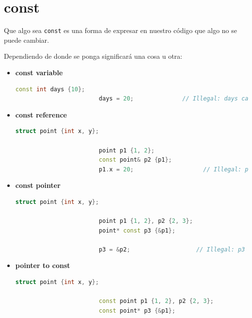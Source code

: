 \documentclass[12pt, fleqn]{report}                             %
\theoremstyle{break}                                            %
\newcommand{\textCode}[1]  { \texttt{#1} }                      %
\begin{document}
        \section{const}


            Que algo sea \textCode{const} es una forma de expresar en nuestro código que
            algo no se puede cambiar.
            
            Dependiendo de donde se ponga significará una cosa u otra:
            \begin{itemize}
                \item \textbf{const variable}
                    \begin{lstlisting}[language=C++, gobble=24]
                        const int days {10};
                        days = 20;              // Illegal: days cannot change
                    \end{lstlisting}

                \item \textbf{const reference}
                    \begin{lstlisting}[language=C++, gobble=24]
                        struct point {int x, y};

                        point p1 {1, 2};
                        const point& p2 {p1};
                        p1.x = 20;                    // Illegal: point cannot change
                    \end{lstlisting}

                \item \textbf{const pointer}
                    \begin{lstlisting}[language=C++, gobble=24]
                        struct point {int x, y};

                        point p1 {1, 2}, p2 {2, 3};
                        point* const p3 {&p1};

                        p3 = &p2;                   // Illegal: p3 cannot change
                    \end{lstlisting}

                \item \textbf{pointer to const}
                    \begin{lstlisting}[language=C++, gobble=24]
                        struct point {int x, y};

                        const point p1 {1, 2}, p2 {2, 3};
                        const point* p3 {&p1};
                        

\end{lstlisting}
\end{itemize}
\end{document}
